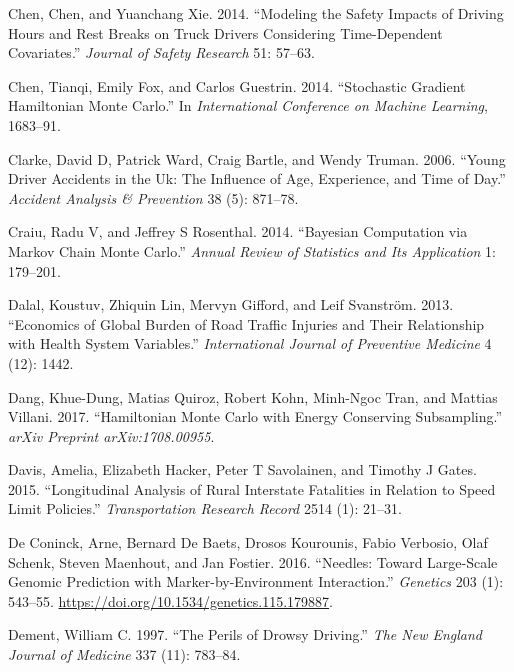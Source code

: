 \documentclass[12pt]{book}
\numberwithin{equation}{chapter}
\begin{document}
\leavevmode\hypertarget{ref-chen2014modeling}{}%
Chen, Chen, and Yuanchang Xie. 2014. ``Modeling the Safety Impacts of Driving Hours and Rest Breaks on Truck Drivers Considering Time-Dependent Covariates.'' \emph{Journal of Safety Research} 51: 57--63.

\leavevmode\hypertarget{ref-chen2014stochastic}{}%
Chen, Tianqi, Emily Fox, and Carlos Guestrin. 2014. ``Stochastic Gradient Hamiltonian Monte Carlo.'' In \emph{International Conference on Machine Learning}, 1683--91.

\leavevmode\hypertarget{ref-clarke2006young}{}%
Clarke, David D, Patrick Ward, Craig Bartle, and Wendy Truman. 2006. ``Young Driver Accidents in the Uk: The Influence of Age, Experience, and Time of Day.'' \emph{Accident Analysis \& Prevention} 38 (5): 871--78.

\leavevmode\hypertarget{ref-craiu2014bayesian}{}%
Craiu, Radu V, and Jeffrey S Rosenthal. 2014. ``Bayesian Computation via Markov Chain Monte Carlo.'' \emph{Annual Review of Statistics and Its Application} 1: 179--201.

\leavevmode\hypertarget{ref-dalal2013economics}{}%
Dalal, Koustuv, Zhiquin Lin, Mervyn Gifford, and Leif Svanström. 2013. ``Economics of Global Burden of Road Traffic Injuries and Their Relationship with Health System Variables.'' \emph{International Journal of Preventive Medicine} 4 (12): 1442.

\leavevmode\hypertarget{ref-dang2017hamiltonian}{}%
Dang, Khue-Dung, Matias Quiroz, Robert Kohn, Minh-Ngoc Tran, and Mattias Villani. 2017. ``Hamiltonian Monte Carlo with Energy Conserving Subsampling.'' \emph{arXiv Preprint arXiv:1708.00955}.

\leavevmode\hypertarget{ref-davis2015longitudinal}{}%
Davis, Amelia, Elizabeth Hacker, Peter T Savolainen, and Timothy J Gates. 2015. ``Longitudinal Analysis of Rural Interstate Fatalities in Relation to Speed Limit Policies.'' \emph{Transportation Research Record} 2514 (1): 21--31.

\leavevmode\hypertarget{ref-Coninck2016}{}%
De Coninck, Arne, Bernard De Baets, Drosos Kourounis, Fabio Verbosio, Olaf Schenk, Steven Maenhout, and Jan Fostier. 2016. ``Needles: Toward Large-Scale Genomic Prediction with Marker-by-Environment Interaction.'' \emph{Genetics} 203 (1): 543--55. \url{https://doi.org/10.1534/genetics.115.179887}.

\leavevmode\hypertarget{ref-dement1997perils}{}%
Dement, William C. 1997. ``The Perils of Drowsy Driving.'' \emph{The New England Journal of Medicine} 337 (11): 783--84.
\end{document}
